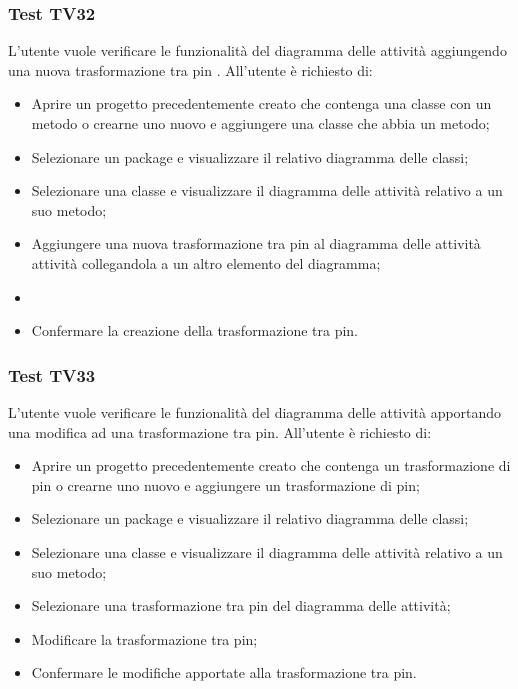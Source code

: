\documentclass[../PianoDiQualifica.tex]{subfiles}
\begin{document}
	\subsubsection{Test TV32} 
	L'utente vuole verificare le funzionalità del diagramma delle attività aggiungendo una nuova trasformazione tra pin . 
	All'utente è richiesto di: 
	\begin{itemize} 
		\item Aprire un progetto precedentemente creato che contenga una classe con un metodo o crearne uno nuovo e aggiungere una classe che abbia un metodo;
		\item Selezionare un package e visualizzare il relativo diagramma delle classi; 
		\item Selezionare una classe e visualizzare il diagramma delle attività relativo a un suo metodo; %
		\item Aggiungere una nuova trasformazione tra pin al diagramma delle attività attività collegandola a un altro elemento del diagramma; 
		\item
		\item Confermare la creazione della trasformazione tra pin.%
	\end{itemize} 
	
	\subsubsection{Test TV33} 
	L'utente vuole verificare le funzionalità del diagramma delle attività apportando una modifica ad una trasformazione tra pin. 
	All'utente è richiesto di: 
	\begin{itemize} 
		\item Aprire un progetto precedentemente creato che contenga un trasformazione di pin o crearne uno nuovo e aggiungere un trasformazione di pin;
		\item Selezionare un package e visualizzare il relativo diagramma delle classi; 
		\item Selezionare una classe e visualizzare il diagramma delle attività relativo a un suo metodo; 
		\item Selezionare una trasformazione tra pin del diagramma delle attività;
		\item Modificare la trasformazione tra pin;%
		\item Confermare le modifiche apportate alla trasformazione tra pin. 
	\end{itemize} 
	
\end{document}
